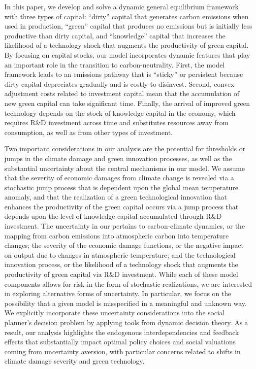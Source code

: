 \documentclass[12pt]{article}
\begin{document}
In this paper, we develop and solve a dynamic general equilibrium framework with three types of capital: ``dirty'' capital that generates carbon emissions when used in production, ``green'' capital that produces no emissions but is initially less productive than dirty capital, and ``knowledge'' capital that increases the likelihood of a technology shock that augments the productivity of green capital. By focusing on capital stocks, our model incorporates dynamic features that play an important role in the transition to carbon-neutrality. First, the model framework leads to an emissions pathway that is ``sticky'' or persistent because dirty capital depreciates gradually and is costly to disinvest. Second, convex adjustment costs related to investment capital mean that the accumulation of new green capital can take significant time. Finally, the arrival of improved green technology depends on the stock of knowledge capital in the economy, which requires R\&D investment across time and substitutes resources away from consumption, as well as from other types of investment. 

Two important considerations in our analysis are the potential for thresholds or jumps in the climate damage and green innovation processes, as well as the substantial uncertainty about the central mechanisms in our model. We assume that the severity of economic damages from climate change is revealed via a stochastic jump process that is dependent upon the global mean temperature anomaly, and that the realization of a green technological innovation that enhances the productivity of the green capital occurs via a jump process that depends upon the level of knowledge capital accumulated through R\&D investment. The uncertainty in our pertains to carbon-climate dynamics, or the mapping from carbon emissions into atmospheric carbon into temperature changes; the severity of the economic damage functions, or the negative impact on output due to changes in atmospheric temperature; and the technological innovation process, or the likelihood of a technology shock that augments the productivity of green capital via R\&D investment. While each of these model components allows for risk in the form of stochastic realizations, we are interested in exploring alternative forms of uncertainty. In particular, we focus on the possibility that a given model is misspecified in a meaningful and unknown way. We explicitly incorporate these uncertainty considerations into the social planner's decision problem by applying tools from dynamic decision theory. As a result, our analysis highlights the endogenous interdependencies and feedback effects that substantially impact optimal policy choices and social valuations coming from uncertainty aversion, with particular concerns related to shifts in climate damage severity and green technology.
\end{document}
